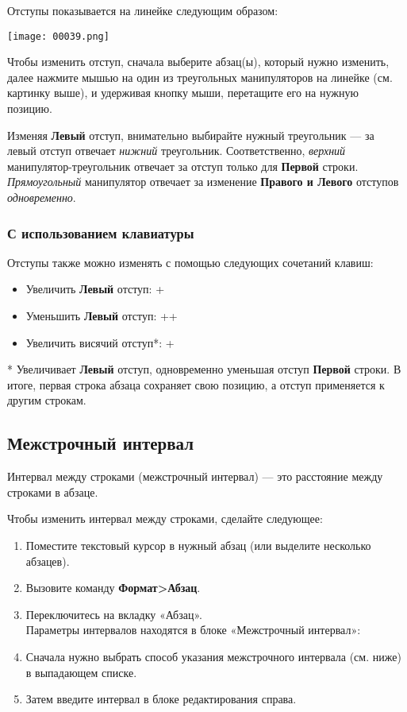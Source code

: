 \documentclass[a4paper,10pt]{article}
\begin{document}
Отступы показывается на линейке следующим образом:

\texttt{[image: 00039.png]}

Чтобы изменить отступ, сначала выберите абзац(ы), который нужно изменить, далее нажмите мышью на один из треугольных манипуляторов на линейке (см. картинку выше), и удерживая кнопку мыши, перетащите его на нужную позицию.

Изменяя \textbf{Левый} отступ, внимательно выбирайте нужный треугольник --- за левый отступ отвечает \textit{нижний} треугольник. Соответственно, \textit{верхний} манипулятор-треугольник отвечает за отступ только для \textbf{Первой} строки. \textit{Прямоугольный} манипулятор отвечает за изменение \textbf{Правого и Левого} отступов \textit{одновременно}.

\subsubsection{С использованием клавиатуры}
Отступы также можно изменять с помощью следующих сочетаний клавиш:
\begin{itemize}
 \item Увеличить \textbf{Левый} отступ: +
 \item Уменьшить \textbf{Левый} отступ: ++
 \item Увеличить висячий отступ*: + 
\end{itemize}

* Увеличивает \textbf{Левый} отступ, одновременно уменьшая отступ \textbf{Первой} строки. В итоге, первая строка абзаца сохраняет свою позицию, а отступ применяется к другим строкам.

\subsection{Межстрочный интервал}
Интервал между строками (межстрочный интервал) --- это расстояние между строками в абзаце. 

Чтобы изменить интервал между строками, сделайте следующее:
\begin{enumerate}
 \item Поместите текстовый курсор в нужный абзац (или выделите несколько абзацев).
 \item Вызовите команду \textbf{Формат>Абзац}.
 \item Переключитесь на вкладку «Абзац».\\
 Параметры интервалов находятся в блоке «Межстрочный интервал»:
 \item Сначала нужно выбрать способ указания межстрочного интервала (см. ниже) в выпадающем списке.
 \item Затем введите интервал в блоке редактирования справа.
\end{enumerate}
\end{document}

